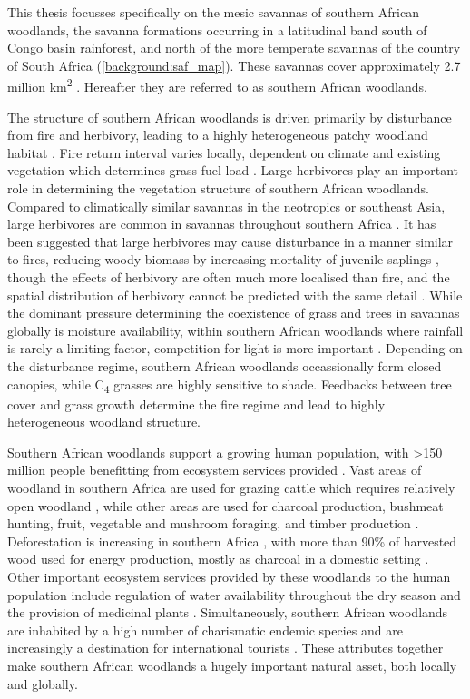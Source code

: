 \begin{refsection}
This thesis focusses specifically on the mesic savannas of southern African woodlands, the savanna formations occurring in a latitudinal band south of Congo basin rainforest, and north of the more temperate savannas of the country of South Africa (\autoref{background:saf_map}). These savannas cover approximately 2.7 million km\textsuperscript{2} \citep{Arino2010}. Hereafter they are referred to as southern African woodlands.

The structure of southern African woodlands is driven primarily by disturbance from fire and herbivory, leading to a highly heterogeneous patchy woodland habitat \citep{Archibald2019}. Fire return interval varies locally, dependent on climate and existing vegetation which determines grass fuel load \citep{Archibald2010}. Large herbivores play an important role in determining the vegetation structure of southern African woodlands. Compared to climatically similar savannas in the neotropics or southeast Asia, large herbivores are common in savannas throughout southern Africa \citep{Asner2009}. It has been suggested that large herbivores may cause disturbance in a manner similar to fires, reducing woody biomass by increasing mortality of juvenile saplings \citep{Bond2005}, though the effects of herbivory are often much more localised than fire, and the spatial distribution of herbivory cannot be predicted with the same detail \citep{Hempson2015}. While the dominant pressure determining the coexistence of grass and trees in savannas globally is moisture availability, within southern African woodlands where rainfall is rarely a limiting factor, competition for light is more important \citep{Vadigi2013}. Depending on the disturbance regime, southern African woodlands occassionally form closed canopies, while C\textsubscript{4} grasses are highly sensitive to shade. Feedbacks between tree cover and grass growth determine the fire regime and lead to highly heterogeneous woodland structure.

Southern African woodlands support a growing human population, with >150 million people benefitting from ecosystem services provided \citep{Ryan2016, Wunder2014}. Vast areas of woodland in southern Africa are used for grazing cattle which requires relatively open woodland \citep{Njana2013}, while other areas are used for charcoal production, bushmeat hunting, fruit, vegetable and mushroom foraging, and timber production \citep{Ryan2016}. Deforestation is increasing in southern Africa \citep{Hansen2013}, with more than 90\% of harvested wood used for energy production, mostly as charcoal in a domestic setting \citep{May-Tobin2011}. Other important ecosystem services provided by these woodlands to the human population include regulation of water availability throughout the dry season \citep{Wilk2010, Hecky2003} and the provision of medicinal plants \citep{Ryan2016, Augustino2011}. Simultaneously, southern African woodlands are inhabited by a high number of charismatic endemic species \citep{Burgess2004} and are increasingly a destination for international tourists \citep{Vergles2015, Shackleton2007}. These attributes together make southern African woodlands a hugely important natural asset, both locally and globally.


\end{refsection}
